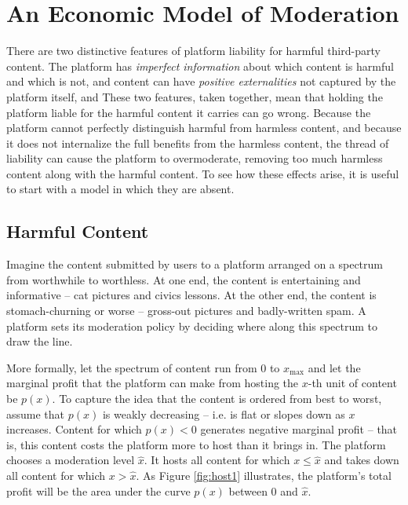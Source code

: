 \newcommand{\xmax}{x_{\text{max}}}
\newcommand{\xbi}{x_{\text{BI}}^*}
\newcommand{\xsl}{x_{\text{SL}}^*}
\newcommand{\xsubi}{x_{\text{I}}^*}

\section{An Economic Model of Moderation}

There are two distinctive features of platform liability for harmful third-party content. The platform has \emph{imperfect information} about which content is harmful and which is not, and  content can have \emph{positive externalities} not captured by the platform itself, and  These two features, taken together, mean that holding the platform liable for the harmful content it carries can go wrong. Because the platform cannot perfectly distinguish harmful from harmless content, and because it does not internalize the full benefits from the harmless content, the thread of liability can cause the platform to overmoderate, removing too much harmless content along with the harmful content. To see how these effects arise, it is useful to start with a model in which they are absent.


\subsection{Harmful Content}

Imagine the content submitted by users to a platform arranged on a spectrum from worthwhile to worthless. At one end, the content is entertaining and informative -- cat pictures and civics lessons. At the other end, the content is stomach-churning or worse -- gross-out pictures and badly-written spam. A platform sets its moderation policy by deciding where along this spectrum to draw the line.

More formally, let the spectrum of content run from $0$ to $\xmax$ and let the marginal profit that the platform can make from hosting the $x$-th unit of content be $p(x)$. To capture the idea that the content is ordered from best to worst, assume that $p(x)$ is weakly decreasing -- i.e. is flat or slopes down as $x$ increases. Content for which $p(x) <0$ generates negative marginal profit -- that is, this content costs the platform more to host than it brings in. The platform chooses a moderation level $\hat{x}$. It hosts all content for which $x \le \hat{x}$ and takes down all content for which $x > \hat{x}$. As Figure \ref{fig:host1} illustrates, the platform's total profit will be the area under the curve $p(x)$ between $0$ and $\hat{x}$. 

